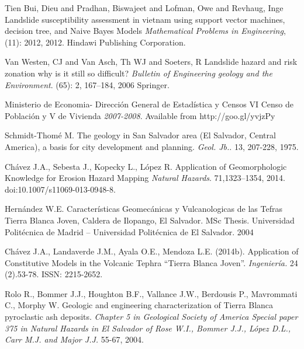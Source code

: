 \documentclass[11pt,twoside]{rmta2010esp}%
\begin{document}
\begin{thebibliography}{99}
Tien Bui, Dieu and Pradhan, Biswajeet and Lofman, Owe and Revhaug, Inge
\newblock Landslide susceptibility assessment in vietnam using support vector machines, decision tree, and Naive Bayes Models
\newblock \emph{Mathematical Problems in Engineering},
  (11): 2012, 2012.
\newblock Hindawi Publishing Corporation.




Van Westen, CJ and Van Asch, Th WJ and Soeters, R
\newblock Landslide hazard and risk zonation why is it still so difficult?
\newblock \emph{Bulletin of Engineering geology and the Environment}.
(65): 2, 167--184, 2006
\newblock Springer. 



Ministerio de Economia- Direcci\'{o}n General de Estad\'{i}stica y Censos
\newblock VI Censo de Poblaci\'{o}n y V de Vivienda
\newblock \emph{2007-2008}.
 Available from http://goo.gl/yvjzPy




Schmidt-Thom\'{e} M.
\newblock The geology in San Salvador area (El Salvador, Central America), a basis for city development and planning.
\newblock \emph{Geol. Jb.}.
 13, 207-228, 1975.


Ch\'{a}vez J.A., Sebesta J., Kopecky L., L\'{o}pez R.
\newblock Application of Geomorphologic Knowledge for Erosion Hazard Mapping
\newblock \emph{Natural Hazards}.
 71,1323–1354, 2014.
\newblock doi:10.1007/s11069-013-0948-8.


Hern\'{a}ndez W.E.
\newblock Caracter\'{i}sticas Geomec\'{a}nicas y Vulcanologicas de las Tefras Tierra Blanca Joven, Caldera de Ilopango, El Salvador.
\newblock MSc Thesis. Universidad Polit\'{e}cnica de Madrid – Universidad Polit\'{e}cnica de El Salvador.
 2004


Ch\'{a}vez J.A.,  Landaverde J.M., Ayala O.E., Mendoza L.E. (2014b). 
\newblock Application of Constitutive Models in the Volcanic Tephra ``Tierra Blanca Joven''.
\newblock \emph{Ingenier\'{i}a.}
  24 (2).53-78.
\newblock  ISSN: 2215-2652.


Rolo R., Bommer J.J., Houghton B.F., Vallance J.W., Berdousis P., Mavrommati C., Morphy W.
\newblock Geologic and engineering characterization of Tierra Blanca pyroclastic ash deposits.
\newblock \emph{Chapter 5 in Geological Society of America Special paper 375 in Natural Hazards in El Salvador of Rose W.I., Bommer J.J., L\'{o}pez D.L., Carr M.J. and Major J.J.}
  55-67, 2004.



\end{thebibliography}
\end{document}
